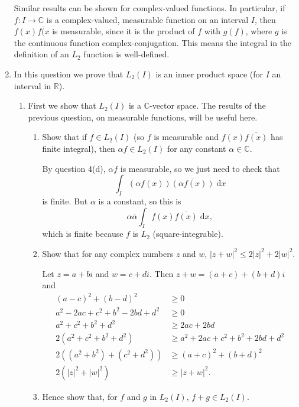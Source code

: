 \documentclass{article}
\newcommand{\diff}{\;\mathrm{d}}
\begin{document}
\begin{enumerate}
\begin{enumerate}
		\end{enumerate}
		Similar results can be shown for complex-valued functions. In particular, if $f:I\to \mathbb{C}$ is a complex-valued, measurable function on an interval $I$, then $f(x)\overline{f(x}$ is measurable, since it is the product of $f$ with $g(f)$, where $g$ is the continuous function complex-conjugation. This means the integral in the definition of an $L_2$ function is well-defined.
	\item In this question we prove that $L_2(I)$ is an inner product space (for $I$ an interval in $\mathbb{R}$).
		\begin{enumerate}
			\item First we show that $L_2(I)$ is a $\mathbb{C}$-vector space. The results of the previous question, on measurable functions, will be useful here.
				\begin{enumerate}
					\item Show that if $f\in L_2(I)$ (so $f$ is measurable and $f(x)\overline{f(x)}$ has finite integral), then $\alpha f\in L_2(I)$ for any constant $\alpha\in \mathbb{C}$.
					
						{\color{blue}
							By question 4(d), $\alpha f$ is measurable, so we just need to check that
							\[\int_I(\alpha f(x))\overline{(\alpha f(x))}\diff x\]
							is finite. But $\alpha$ is a constant, so this is
							\[\alpha\overline{\alpha}\int_I f(x)\overline{f(x)}\diff x,\]
							which is finite because $f$ is $L_2$ (square-integrable).
						}
					
					\item Show that for any complex numbers $z$ and $w$, $|z+w|^2\leq 2|z|^2 + 2|w|^2$.
					
						{\color{blue}
							Let $z=a+bi$ and $w=c+di$. Then $z+w=(a+c)+(b+d)i$ and
							\begin{align*}
								(a-c)^2 + (b-d)^2&\geq 0\\
								a^2-2ac+c^2+b^2-2bd+d^2&\geq 0\\
								a^2+c^2+b^2+d^2&\geq 2ac+2bd\\
								2\left(a^2+c^2+b^2+d^2\right)&\geq a^2+2ac+c^2 + b^2+2bd +d^2\\
								2\left((a^2+b^2)+(c^2+d^2)\right) &\geq (a+c)^2+(b+d)^2\\
								2\left(|z|^2+|w|^2\right)&\geq |z+w|^2.
							\end{align*}
						}
					
					\item Hence show that, for $f$ and $g$ in $L_2(I)$, $f+g\in L_2(I)$.
						

\end{enumerate}
\end{enumerate}
\end{enumerate}
\end{document}
